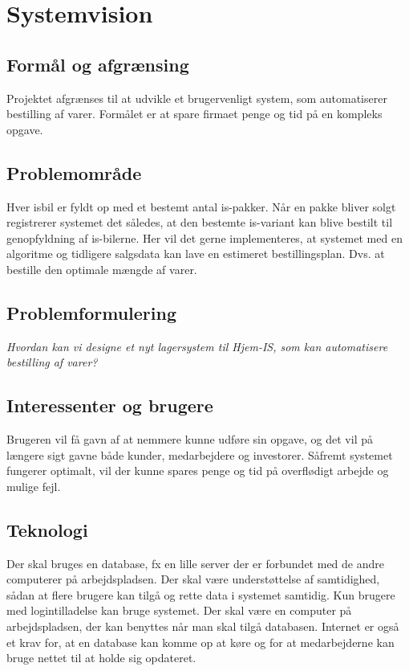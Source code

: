 \chapter{Systemvision}\label{ch:systemvision}

\section{Formål og afgrænsing}
Projektet afgrænses til at udvikle et brugervenligt system, som automatiserer bestilling af varer. 
Formålet er at spare firmaet penge og tid på en kompleks opgave.

\section{Problemområde}
Hver isbil er fyldt op med et bestemt antal is-pakker. Når en pakke bliver solgt registrerer systemet det således, at den bestemte is-variant kan blive bestilt til genopfyldning af is-bilerne. Her vil det gerne implementeres, at systemet med en algoritme og tidligere salgsdata kan lave en estimeret bestillingsplan. Dvs. at bestille den optimale mængde af varer.

\section{Problemformulering}
\textit{Hvordan kan vi designe et nyt lagersystem til Hjem-IS, som kan automatisere bestilling af varer?}

\section{Interessenter og brugere}
Brugeren vil få gavn af at nemmere kunne udføre sin opgave, og det vil på længere sigt gavne både kunder, medarbejdere og investorer. Såfremt systemet fungerer optimalt, vil der kunne spares penge og tid på overflødigt arbejde og mulige fejl.

\section{Teknologi}
Der skal bruges en database, fx en lille server der er forbundet med de andre computerer på arbejdspladsen. Der skal være understøttelse af samtidighed, sådan at flere brugere kan tilgå og rette data i systemet samtidig. Kun brugere med logintilladelse kan bruge systemet. Der skal være en computer på arbejdspladsen, der kan benyttes når man skal tilgå databasen. Internet er også et krav for, at en database kan komme op at køre og for at medarbejderne kan bruge nettet til at holde sig opdateret.

